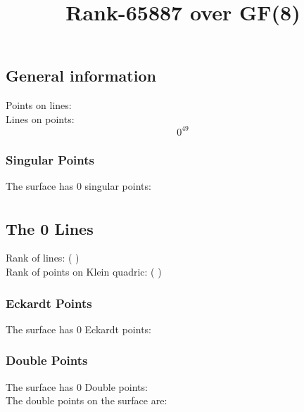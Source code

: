 \documentclass{article}
\newcommand\setTBstruts{\def\T{\rule{0pt}{2.6ex}}%
\def\B{\rule[-1.2ex]{0pt}{0pt}}}
\begin{document}
 
\setTBstruts



{\allowdisplaybreaks%






\title{Rank-65887 over GF(8)}
\author{}%
\maketitle%
%
{}



\subsection*{General information}
Points on lines:
$$
$$
Lines on points:
$$
0^{49}$$
\subsubsection*{Singular Points}
The surface has 0 singular points:\\
\begin{align*}
\end{align*}
\subsection*{The 0 Lines}
Rank of lines: (  )\\
Rank of points on Klein quadric: (  )\\
\subsubsection*{Eckardt Points}
The surface has 0 Eckardt points:\\
\subsubsection*{Double Points}
The surface has 0 Double points:\\
The double points on the surface are:\\
\begin{multicols}{2}
\noindent
\end{multicols}
}
\end{document}
